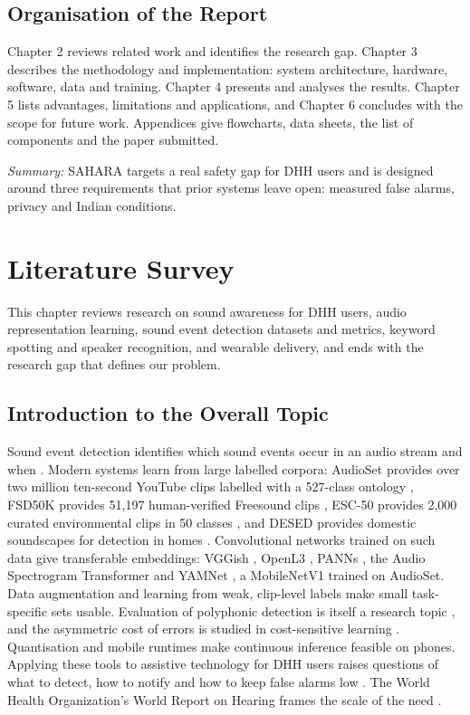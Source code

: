 \documentclass[12pt,a4paper,oneside]{report}
\begin{document}
\section{Organisation of the Report}
Chapter 2 reviews related work and identifies the research gap. Chapter 3 describes the methodology and implementation: system architecture, hardware, software, data and training. Chapter 4 presents and analyses the results. Chapter 5 lists advantages, limitations and applications, and Chapter 6 concludes with the scope for future work. Appendices give flowcharts, data sheets, the list of components and the paper submitted.

\textit{Summary:} SAHARA targets a real safety gap for DHH users and is designed around three requirements that prior systems leave open: measured false alarms, privacy and Indian conditions.

\chapter{Literature Survey}
This chapter reviews research on sound awareness for DHH users, audio representation learning, sound event detection datasets and metrics, keyword spotting and speaker recognition, and wearable delivery, and ends with the research gap that defines our problem.

\section{Introduction to the Overall Topic}
Sound event detection identifies which sound events occur in an audio stream and when \cite{mesaros2021}. Modern systems learn from large labelled corpora: AudioSet provides over two million ten-second YouTube clips labelled with a 527-class ontology \cite{gemmeke2017}, FSD50K provides 51,197 human-verified Freesound clips \cite{fonseca2022}, ESC-50 provides 2,000 curated environmental clips in 50 classes \cite{piczak2015}, and DESED provides domestic soundscapes for detection in homes \cite{turpault2019}. Convolutional networks trained on such data give transferable embeddings: VGGish \cite{hershey2017}, OpenL3 \cite{cramer2019}, PANNs \cite{kong2020}, the Audio Spectrogram Transformer \cite{gong2021} and YAMNet \cite{yamnet}, a MobileNetV1 \cite{howard2017} trained on AudioSet. Data augmentation \cite{salamon2017} and learning from weak, clip-level labels \cite{kumar2016} make small task-specific sets usable. Evaluation of polyphonic detection is itself a research topic \cite{mesaros2016}, and the asymmetric cost of errors is studied in cost-sensitive learning \cite{elkan2001}. Quantisation and mobile runtimes \cite{jacob2018} make continuous inference feasible on phones. Applying these tools to assistive technology for DHH users raises questions of what to detect, how to notify and how to keep false alarms low \cite{matthews2006,bragg2016,findlater2019,goodman2020}. The World Health Organization's World Report on Hearing frames the scale of the need \cite{who2021}.
\end{document}
